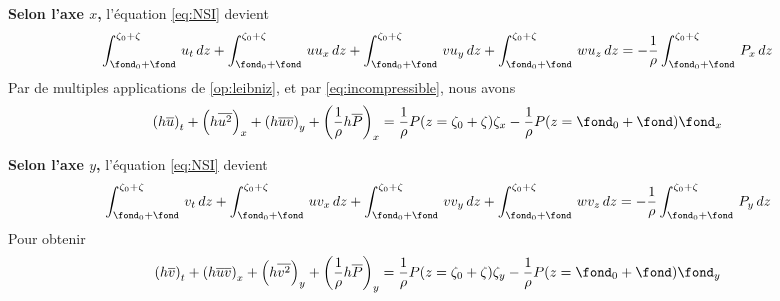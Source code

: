\noindent \textbf{Selon l'axe $x$,} l'équation \eqref{eq:NSI} devient
\begin{equation}
	\int_{\fond_0+\fond}^{\zeta_0+\zeta}\,u_t\,dz + \int_{\fond_0+\fond}^{\zeta_0+\zeta}\,uu_x\,dz + \int_{\fond_0+\fond}^{\zeta_0+\zeta}\,vu_y\,dz + \int_{\fond_0+\fond}^{\zeta_0+\zeta}\,wu_z\,dz = -\frac{1}{\rho}\int_{\fond_0+\fond}^{\zeta_0+\zeta}\,P_x\,dz
\end{equation}
Par de multiples applications de \eqref{op:leibniz}, et par \eqref{eq:incompressible}, nous avons
\begin{equation}
\left(h\overline{u}\right)_t + \left(h\overline{u^2}\right)_x + \left(h\overline{u}\overline{v}\right)_y + \left(\frac{1}{\rho}h\overline{P}\right)_x = \frac{1}{\rho}P(z=\zeta_0+\zeta)\zeta_x -\frac{1}{\rho} P(z=\fond_0 + \fond)\fond_x
\end{equation}

\noindent \textbf{Selon l'axe $y$,} l'équation \eqref{eq:NSI} devient
\begin{equation}
\int_{\fond_0+\fond}^{\zeta_0+\zeta}\,v_t\,dz + \int_{\fond_0+\fond}^{\zeta_0+\zeta}\,uv_x\,dz + \int_{\fond_0+\fond}^{\zeta_0+\zeta}\,vv_y\,dz + \int_{\fond_0+\fond}^{\zeta_0+\zeta}\,wv_z\,dz = -\frac{1}{\rho}\int_{\fond_0+\fond}^{\zeta_0+\zeta}\,P_y\,dz
\end{equation}
Pour obtenir
\begin{equation}
\left(h\overline{v}\right)_t + \left(h\overline{u}\overline{v}\right)_x + \left(h\overline{v^2}\right)_y + \left(\frac{1}{\rho}h\overline{P}\right)_y = \frac{1}{\rho}P(z=\zeta_0+\zeta)\zeta_y -\frac{1}{\rho} P(z=\fond_0+\fond)\fond_y
\end{equation}

